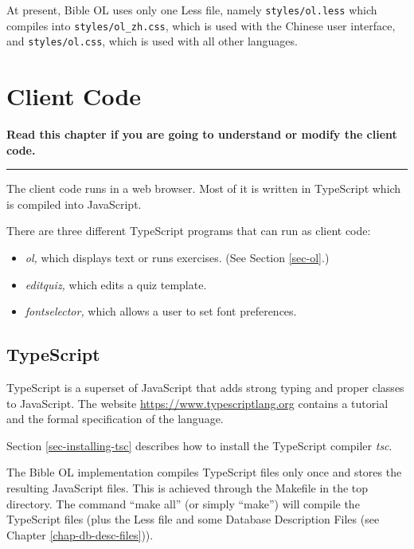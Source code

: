 \documentclass[11pt,oneside,a4paper]{memoir}
\begin{document}
At present, Bible OL uses only one Less file, namely \texttt{styles/ol.less} which compiles into
\texttt{styles/ol\_zh.css}, which is used with the Chinese user interface, and
\texttt{styles/ol.css}, which is used with all other languages.

\chapter{Client Code}\label{chap-client-code}

\textbf{Read this chapter if you are going to understand or modify the client code.}
\plainbreak{3}

The client code runs in a web browser. Most of it is written in TypeScript which is compiled into
JavaScript.

There are three different TypeScript programs that can run as client code:


\begin{itemize}
\item \emph{ol,} which displays text or runs exercises. (See Section \ref{sec-ol}.)
\item \emph{editquiz,} which edits a quiz template.
\item \emph{fontselector,} which allows a user to set font preferences.
\end{itemize}

\section{TypeScript}\label{sec-typescript-use}

TypeScript is a superset of JavaScript that adds strong typing and proper classes to JavaScript.
The website \url{https://www.typescriptlang.org} contains a tutorial and the formal specification of
the language.

Section \ref{sec-installing-tsc} describes how to install the TypeScript compiler \emph{tsc}.

The Bible OL implementation compiles TypeScript files only once and stores the resulting JavaScript
files. This is achieved through the Makefile in the top directory. The command ``make all'' (or
simply ``make'') will compile the TypeScript files (plus the Less file and some Database Description Files (see Chapter \ref{chap-db-desc-files})).
\end{document}
